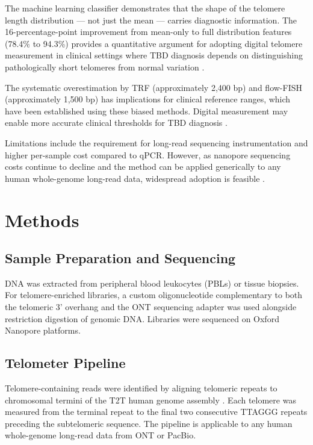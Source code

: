 \documentclass[11pt]{article}
\begin{document}
The machine learning classifier demonstrates that the shape of the telomere length distribution --- not just the mean --- carries diagnostic information. The 16-percentage-point improvement from mean-only to full distribution features (78.4\% to 94.3\%) provides a quantitative argument for adopting digital telomere measurement in clinical settings where TBD diagnosis depends on distinguishing pathologically short telomeres from normal variation \citep{alder2018diagnostic}.

The systematic overestimation by TRF (approximately 2,400 bp) and flow-FISH (approximately 1,500 bp) has implications for clinical reference ranges, which have been established using these biased methods. Digital measurement may enable more accurate clinical thresholds for TBD diagnosis \citep{aubert2012collapse}.

Limitations include the requirement for long-read sequencing instrumentation and higher per-sample cost compared to qPCR. However, as nanopore sequencing costs continue to decline and the method can be applied generically to any human whole-genome long-read data, widespread adoption is feasible \citep{jain2018nanopore}.

\section{Methods}

\subsection{Sample Preparation and Sequencing}

DNA was extracted from peripheral blood leukocytes (PBLs) or tissue biopsies. For telomere-enriched libraries, a custom oligonucleotide complementary to both the telomeric 3' overhang and the ONT sequencing adapter was used alongside restriction digestion of genomic DNA. Libraries were sequenced on Oxford Nanopore platforms.

\subsection{Telometer Pipeline}

Telomere-containing reads were identified by aligning telomeric repeats to chromosomal termini of the T2T human genome assembly \citep{nurk2022complete}. Each telomere was measured from the terminal repeat to the final two consecutive TTAGGG repeats preceding the subtelomeric sequence. The pipeline is applicable to any human whole-genome long-read data from ONT or PacBio.
\end{document}
